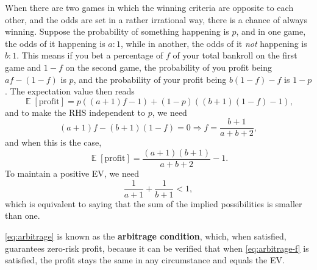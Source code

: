 \documentclass[hyperref, a4paper]{article}
\DeclareMathOperator{\expect}{\mathbb{E}}
\newcommand*{\concept}[1]{{\textbf{#1}}}
\begin{document}
When there are two games in which the winning criteria are opposite to each other,
and the odds are set in a rather irrational way,
there is a chance of always winning.
Suppose the probability of something happening is $p$,
and in one game, the odds of it happening is $a : 1$,
while in another, the odds of it \emph{not} happening is $b : 1$.
This means if you bet a percentage of $f$ of your total bankroll on the first game
and $1 - f$ on the second game,
the probability of you profit being $a f - (1 - f)$ is $p$,
and the probability of your profit being $b (1 - f) - f$ is $1 - p$.
The expectation value then reads 
\begin{equation}
    \expect[\text{profit}] = p ((a + 1) f - 1) + (1 - p) ((b + 1) (1 - f) - 1),
\end{equation}
and to make the RHS independent to $p$, we need 
\begin{equation}
    (a + 1) f - (b + 1) (1 - f) = 0 \Rightarrow
    f = \frac{b + 1}{a + b + 2},
    \label{eq:arbitrage-f}
\end{equation}
and when this is the case,
\begin{equation}
    \expect[\text{profit}] = \frac{(a + 1) (b + 1)}{a + b + 2} - 1.
\end{equation}
To maintain a positive EV, we need 
\begin{equation}
    \frac{1}{a + 1} + \frac{1}{b + 1} < 1,
    \label{eq:arbitrage}
\end{equation}
which is equivalent to saying that the sum of the implied possibilities is smaller than one.

\eqref{eq:arbitrage} is known as the \concept{arbitrage condition},
which, when satisfied, guarantees zero-risk profit,
because it can be verified that when \eqref{eq:arbitrage-f} is satisfied,
the profit stays the same in any circumstance and equals the EV.
\end{document}
